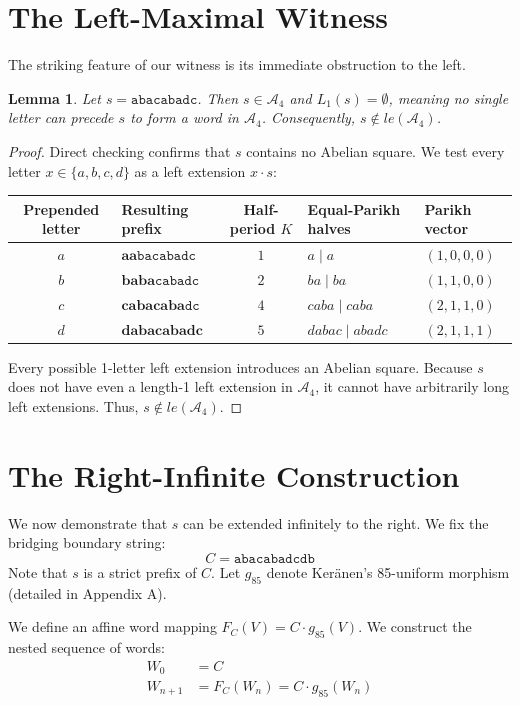 \documentclass[12pt]{article}
\newtheorem{lemma}{Lemma}
\begin{document}
\section{The Left-Maximal Witness}
The striking feature of our witness is its immediate obstruction to the left. 

\begin{lemma}
Let $s = \texttt{abacabadc}$. Then $s \in \mathcal{A}_4$ and $L_1(s) = \emptyset$, meaning no single letter can precede $s$ to form a word in $\mathcal{A}_4$. Consequently, $s \notin le(\mathcal{A}_4)$.
\end{lemma}
\begin{proof}
Direct checking confirms that $s$ contains no Abelian square. We test every letter $x \in \{a,b,c,d\}$ as a left extension $x \cdot s$:

\begin{table}[h]
\centering
\begin{tabular}{c l c l l}
\toprule
Prepended letter & Resulting prefix & Half-period $K$ & Equal-Parikh halves & Parikh vector \\
\midrule
$a$ & $\textbf{aa}\texttt{bacabadc}$ & $1$ & $a \mid a$ & $(1,0,0,0)$ \\
$b$ & $\textbf{baba}\texttt{cabadc}$ & $2$ & $ba \mid ba$ & $(1,1,0,0)$ \\
$c$ & $\textbf{cabacaba}\texttt{dc}$ & $4$ & $caba \mid caba$ & $(2,1,1,0)$ \\
$d$ & $\textbf{dabacabadc}$ & $5$ & $dabac \mid abadc$ & $(2,1,1,1)$ \\
\bottomrule
\end{tabular}
\end{table}

Every possible 1-letter left extension introduces an Abelian square. Because $s$ does not have even a length-1 left extension in $\mathcal{A}_4$, it cannot have arbitrarily long left extensions. Thus, $s \notin le(\mathcal{A}_4)$.
\end{proof}


\section{The Right-Infinite Construction}
We now demonstrate that $s$ can be extended infinitely to the right. We fix the bridging boundary string:
$$C = \texttt{abacabadcdb}$$
Note that $s$ is a strict prefix of $C$. Let $g_{85}$ denote Ker\"anen's 85-uniform morphism (detailed in Appendix A).

We define an affine word mapping $F_C(V) = C \cdot g_{85}(V)$. We construct the nested sequence of words:
\begin{align*}
W_0 &= C \\
W_{n+1} &= F_C(W_n) = C \cdot g_{85}(W_n)
\end{align*}
\end{document}
